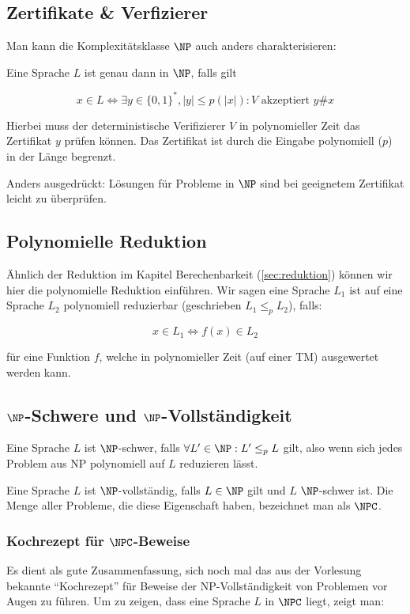 \documentclass[a4paper,parskip=half*,DIV=7,fontsize=11pt]{scrartcl}
\begin{document}
\subsection{Zertifikate \& Verfizierer}
Man kann die Komplexitätsklasse $\NP$ auch anders charakterisieren:

Eine Sprache $L$ ist genau dann in $\NP$, falls gilt

\[x\in L \iff \exists y\in \{0,1\}^*, |y|\leq p(|x|): \text{$V$ akzeptiert $y\#x$}\]

Hierbei muss der deterministische Verifizierer $V$ in polynomieller Zeit das Zertifikat $y$ prüfen können. Das Zertifikat ist durch die Eingabe polynomiell ($p$) in der Länge begrenzt.

Anders ausgedrückt: Lösungen für Probleme in $\NP$ sind bei geeignetem Zertifikat leicht zu überprüfen. 

\subsection{Polynomielle Reduktion}
Ähnlich der Reduktion im Kapitel Berechenbarkeit (\ref{sec:reduktion}) können wir hier die polynomielle Reduktion einführen. Wir sagen eine Sprache  $L_1$ ist auf eine Sprache $L_2$ polynomiell reduzierbar (geschrieben $L_1 \leq_p L_2$), falls:

\[x \in L_1 \iff f(x) \in L_2\]

für eine Funktion $f$, welche in polynomieller Zeit (auf einer TM) ausgewertet werden kann.

\subsection[NP-Schwere und NP-Vollständigkeit]{$\NP$-Schwere und $\NP$-Vollständigkeit}
Eine Sprache $L$ ist $\NP$-schwer, falls $\forall L' \in \NP : L' \leq_p L$ gilt, also wenn sich jedes Problem aus NP polynomiell auf $L$ reduzieren lässt.

Eine Sprache $L$ ist $\NP$-vollständig, falls $L \in \NP$ gilt und $L$ $\NP$-schwer ist. Die Menge aller Probleme, die diese Eigenschaft haben, bezeichnet man als $\NPC$.

\subsubsection[Kochrezept für NPC-Beweise]{Kochrezept für $\NPC$-Beweise}

Es dient als gute Zusammenfassung, sich noch mal das aus der Vorlesung bekannte ``Kochrezept'' für Beweise der NP-Vollständigkeit von Problemen vor Augen zu führen. Um zu zeigen, dass eine Sprache $L$ in $\NPC$ liegt, zeigt man:
\end{document}
